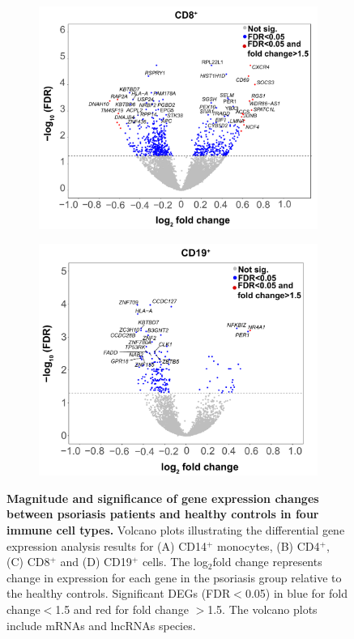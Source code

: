\begin{figure}[htbp]
\begin{subfigure}{0.5\textwidth}
\centering
\includegraphics[width=\textwidth]{./Results2/pdfs/RNA_PS_CTL_CD8_volcano_plot}
\caption{\textbf{}}
\end{subfigure}%
\begin{subfigure}{0.5\textwidth}
\centering
\includegraphics[width=\textwidth]{./Results2/pdfs/RNA_PS_CTL_CD19_volcano_plot}
\caption{\textbf{}}
\end{subfigure}
\caption[Magnitude and significance of gene expression changes between psoriasis patients and healthy controls in four immune cell types.]{\textbf{Magnitude and significance of gene expression changes between psoriasis patients and healthy controls in four immune cell types.} Volcano plots illustrating the differential gene expression analysis results for (A) CD14$^+$ monocytes, (B) CD4$^+$, (C) CD8$^+$ and (D) CD19$^+$ cells. The log$_2$fold change represents change in expression for each gene in the psoriasis group relative to the healthy controls. Significant DEGs (FDR$<$0.05) in blue for fold change$<$1.5 and red for fold change $>$1.5. The volcano plots include mRNAs and lncRNAs species.}

\end{figure}
